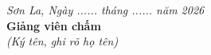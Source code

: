 \documentclass[13pt,a4paper]{extarticle}
\numberwithin{figure}{section}
\numberwithin{table}{section}
\begin{document}
	\vspace{1cm}
	
	\begin{flushright}
		\textit{Sơn La, Ngày ...... tháng ...... năm 2026}\\[0.5cm]
		\textbf{Giảng viên chấm}\\[0.3cm]
		\textit{(Ký tên, ghi rõ họ tên)}
	\end{flushright}
	
	\clearpage
	\tableofcontents
	\clearpage
	
	
\end{document}
